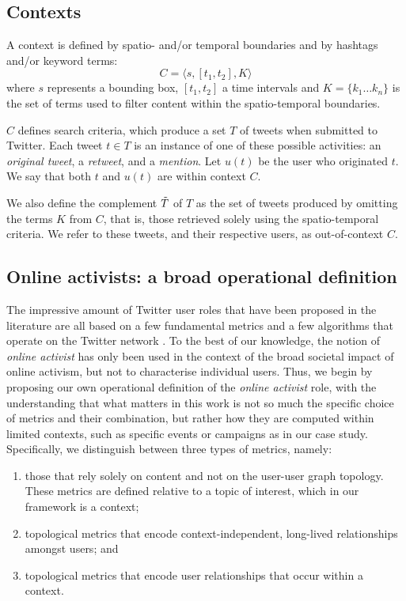 \documentclass[runningheads]{llncs}
\begin{document}
	
\subsection{Contexts}


A context is defined by spatio- and/or temporal boundaries and by hashtags and/or keyword terms:
\begin{equation}
    C = \langle s, [t_1, t_2], K \rangle 
\end{equation}
where $s$ represents a bounding box, $[t_1, t_2]$ a time intervals and $K = \{ k_1 \dots k_n\}$ is the set of terms used to filter content within the spatio-temporal boundaries.

$C$ defines search criteria, which produce a set $T$ of tweets when submitted to Twitter.
Each tweet $t \in T$ is an instance of one of these possible activities: an \textit{original tweet}, a \textit{retweet}, and a \textit{mention}.
Let $u(t)$ be the user who originated $t$.
We say that both $t$ and  $u(t)$ are within context $C$.

We also define the complement $\Tilde{T}$ of $T$ as the set of tweets produced by omitting the terms $K$ from $C$, that is, those retrieved solely using the spatio-temporal criteria. 
We refer to these tweets, and their respective users, as out-of-context $C$.

\subsection{Online activists: a broad operational definition}

The impressive amount of  Twitter user roles that have been proposed in the literature are all based on a few fundamental metrics and a few algorithms that operate on the Twitter network \cite{RIQUELME2016949}.
To the best of our knowledge, the notion of \textit{online activist} has only been used in the context of the broad societal impact of online activism, but not to characterise  individual users.
Thus, we begin by proposing our own operational definition of the \textit{online activist} role, with the understanding that what matters in this work is not so much the specific choice of metrics and their combination, but rather how they are computed within limited contexts, such as specific events or campaigns as in our case study.
Specifically, we distinguish between three types of metrics, namely:
\begin{enumerate}
    \item those that rely solely on content and not on the user-user graph topology. These metrics are defined relative to a topic of interest, which in our framework is a context;
\item topological metrics that encode context-independent, long-lived relationships amongst users; and 
\item topological metrics that encode user relationships that occur within a context.
\end{enumerate}
\end{document}
